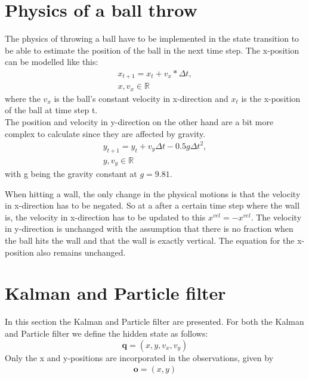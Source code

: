 \documentclass[conference]{IEEEtran}
\begin{document}
\section{Physics of a ball throw}
The physics of throwing a ball have to be implemented in the state transition to be able to estimate the position of the ball in the next time step.  
The x-position can be modelled like this:
\begin{equation*}
    \begin{aligned}
    x_{t+1} = x_{t} + v_x * \Delta t,   \\
    x, v_x \in \mathbb{R}
    \end{aligned}
    \tag{1}
\end{equation*}
where the ${v_x}$ is the ball's constant velocity in x-direction and $x_t$ is the x-position of the ball at time step t. \\
The position and velocity in y-direction on the other hand are a bit more complex to calculate since they are affected by gravity.
\begin{equation*}
    \begin{aligned}
    y_{t+1} = y_t + v_y \Delta t - 0.5 g \Delta t^2, \\
    y, v_y \in \mathbb{R}
    \end{aligned}
    \tag{2}
\end{equation*}
with g being the gravity constant at $g = 9.81$.

When hitting a wall, the only change in the physical motions is that the velocity in x-direction has to be negated.
So at a after a certain time step where the wall is, the velocity in x-direction has to be updated to this $x^{vel} = -x^{vel}$.
The velocity in y-direction is unchanged with the assumption that there is no fraction when the ball hits the wall and that the wall is exactly vertical. 
The equation for the x-position also remains unchanged.


\section{Kalman and Particle filter}
In this section the Kalman and Particle filter are presented. 
For both the Kalman and Particle filter we define the hidden state as follows:
\begin{equation*}
\textbf{q} = (x, y, v_x, v_y)   \tag{3}
\end{equation*}
Only the x and y-positions are incorporated in the observations, given by
\begin{equation*}
    \begin{aligned}
    \textbf{o} = (x, y)
    \end{aligned}
\tag{4}
\end{equation*}
\end{document}
